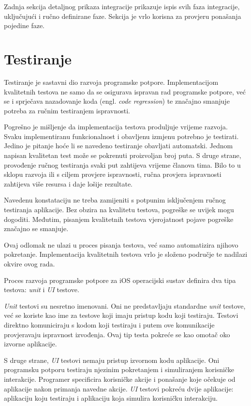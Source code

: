 \documentclass[times, utf8, diplomski, numeric]{fer}
\newcommand{\eng}[1]{(engl. \textit{#1})}
\begin{document}
Zadnja sekcija detaljnog prikaza integracije prikazuje ispis svih faza integracije, uključujući i ručno definirane faze. Sekcija je vrlo korisna za provjeru ponašanja pojedine faze.

\section{Testiranje}

Testiranje je sastavni dio razvoja programske potpore. Implementacijom kvalitetnih testova ne samo da se osigurava ispravan rad programske potpore, već se i sprječava nazadovanje koda \eng{code regression} te značajno smanjuje potreba za ručnim testiranjem ispravnosti\citep{wiki:SoftwareTesting}.

Pogrešno je mišljenje da implementacija testova produljuje vrijeme razvoja. Svaku implementiranu funkcionalnost i obavljenu izmjenu potrebno je testirati. Jedino je pitanje hoće li se navedeno testiranje obavljati automatski. Jednom napisan kvalitetan test može se pokrenuti proizvoljan broj puta. S druge strane, provođenje ručnog testiranja svaki put zahtijeva vrijeme članova tima. Bilo to u sklopu razvoja ili s ciljem provjere ispravnosti, ručna provjera ispravnosti zahtijeva više resursa i daje lošije rezultate.

Navedenu konstataciju ne treba zamijeniti s potpunim isključenjem ručnog testiranja aplikacije. Bez obzira na kvalitetu testova, pogreške se uvijek mogu dogoditi. Međutim, pisanjem kvalitetnih testova vjerojatnost pojave pogreške značajno se smanjuje.

Ovaj odlomak ne ulazi u proces pisanja testova, već samo automatizira njihovo pokretanje. Implementacija kvalitetnih testova vrlo je složeno područje te nadilazi okvire ovog rada.

Proces razvoja programske potpore za iOS operacijski sustav definira dva tipa testova: \textit{unit} i \textit{UI} testove.

\textit{Unit} testovi su nesretno imenovani. Oni ne predstavljaju standardne \textit{unit} testove, već se koriste kao ime za testove koji imaju pristup kodu koji testiraju. Testovi direktno komuniciraju s kodom koji testiraju i putem ove komunikacije provjeravaju ispravnost izvođenja. Ovaj tip testa pokreće se kao omotač oko izvorne aplikacije.

S druge strane, \textit{UI} testovi nemaju pristup izvornom kodu aplikacije. Oni programsku potporu testiraju njezinim pokretanjem i simuliranjem korisničke interakcije. Programer specificira korisničke akcije i ponašanje koje očekuje od aplikacije nakon primanja navedne akcije. \textit{UI} testovi pokreću dvije aplikacije: aplikaciju koju testiraju i aplikaciju koja simulira korisničku interakciju.
\end{document}
